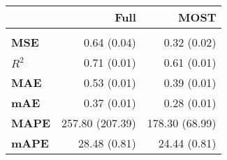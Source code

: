 \centering\begin{tabular}{l|rr}
\toprule
{} &    \textbf{Full} &   \textbf{MOST} \\
\midrule
      &                  &                 \\
\textbf{MSE  } &  0.64 (0.04) &  0.32 (0.02) \\
\textbf{$R^2$} &  0.71 (0.01) &  0.61 (0.01) \\
\textbf{MAE  } &  0.53 (0.01) &  0.39 (0.01) \\
\textbf{mAE  } &  0.37 (0.01) &  0.28 (0.01) \\
\textbf{MAPE } &  257.80 (207.39) &  178.30 (68.99) \\
\textbf{mAPE } &  28.48 (0.81) &  24.44 (0.81) \\
\bottomrule
\end{tabular}
